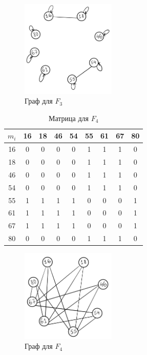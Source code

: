 \documentclass[a4paper, 14pt]{article}
\begin{document}
\begin{figure}
    \centering
    \includegraphics[width=0.4\textwidth]{graph3.png}
    \caption{Граф для $F_3$}
    \label{Рисунок:3}
\end{figure}

\begin{table}
\centering
\begin{tabular}{|c|c|c|c|c|c|c|c|c|}
    \hline
    $m_i$ & 16 & 18 & 46 & 54 & 55 & 61 & 67 & 80 \\
    \hline
    16 & 0 & 0 & 0 & 0 & 1 & 1 & 1 & 0 \\
    \hline
    18 & 0 & 0 & 0 & 0 & 1 & 1 & 1 & 0 \\
    \hline
    46 & 0 & 0 & 0 & 0 & 1 & 1 & 1 & 0 \\
    \hline
    54 & 0 & 0 & 0 & 0 & 1 & 1 & 1 & 0 \\
    \hline
    55 & 1 & 1 & 1 & 1 & 0 & 0 & 0 & 1 \\
    \hline
    61 & 1 & 1 & 1 & 1 & 0 & 0 & 0 & 1 \\
    \hline
    67 & 1 & 1 & 1 & 1 & 0 & 0 & 0 & 1 \\
    \hline
    80 & 0 & 0 & 0 & 0 & 1 & 1 & 1 & 0 \\
    \hline
\end{tabular}
\caption{Матрица для $F_4$}
\label{Матрица:4}
\end{table}

\begin{figure}
    \centering
    \includegraphics[width=0.4\textwidth]{graph4.png}
    \caption{Граф для $F_4$}
    \label{Рисунок:4}
\end{figure}
\end{document}
